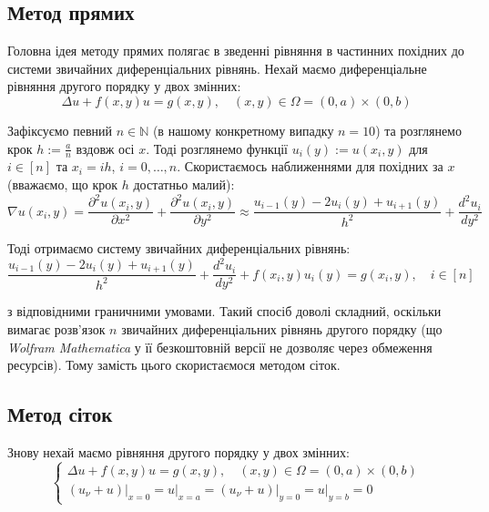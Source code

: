 \documentclass[14pt]{extarticle}
\begin{document}
\subsection{Метод прямих}

Головна ідея методу прямих полягає в зведенні рівняння в частинних похідних 
до системи звичайних диференціальних рівнянь. Нехай маємо диференціальне 
рівняння другого порядку у двох змінних:
\begin{equation*}
    \Delta u + f(x,y)u = g(x,y), \quad (x,y) \in \Omega = (0,a) \times (0,b)
\end{equation*}

Зафіксуємо певний $n \in \mathbb{N}$
(в нашому конкретному випадку $n=10$) та розглянемо крок $h := \frac{a}{n}$
вздовж осі $x$. Тоді розглянемо функції $u_i(y) := u(x_i,y)$ для 
$i \in [n]$ та $x_i = ih$, $i=0,\dots,n$. Скористаємось наближеннями 
для похідних за $x$ (вважаємо, що крок $h$ достатньо малий):
\begin{equation*}
    \nabla u(x_i,y) = \frac{\partial^2 u(x_i,y)}{\partial x^2} + \frac{\partial^2 u(x_i,y)}{\partial y^2} \approx \frac{u_{i-1}(y) - 2u_i(y) + u_{i+1}(y)}{h^2} + \frac{d^2u_i}{dy^2}
\end{equation*}

Тоді отримаємо систему звичайних диференціальних рівнянь:
\begin{equation*}
    \frac{u_{i-1}(y) - 2u_i(y) + u_{i+1}(y)}{h^2} + \frac{d^2u_i}{dy^2} + f(x_i,y)u_i(y) = g(x_i,y), \quad i \in [n]
\end{equation*}

з відповідними граничними умовами. Такий спосіб доволі складний, оскільки вимагає 
розв'язок $n$ звичайних диференціальних рівнянь другого порядку (що \textit{Wolfram Mathematica}
у її безкоштовній версії не дозволяє через обмеження ресурсів). Тому 
замість цього скористаємося методом сіток.

\subsection{Метод сіток}

Знову нехай маємо рівняння другого порядку у двох змінних:
\begin{equation*}
    \begin{cases}
        \Delta u + f(x,y)u = g(x,y), \quad (x,y) \in \Omega = (0,a) \times (0,b) \\
        (u_{\nu}+u)\Big|_{x=0} = u\Big|_{x=a} = (u_{\nu}+u)\Big|_{y=0} = u\Big|_{y=b} = 0
    \end{cases}
\end{equation*}
\end{document}
